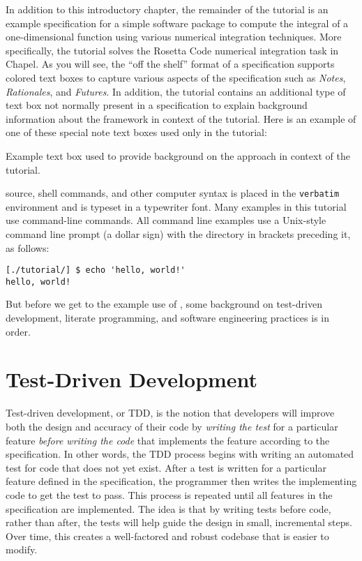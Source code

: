 In addition to this introductory chapter, the remainder of the tutorial is an example \seamless 
specification for a simple software package
to compute the integral of a one-dimensional function using various numerical integration techniques. 
More specifically, the tutorial solves the Rosetta Code numerical integration 
task\cite{rosetta-code-numerical-integration} in Chapel. 
As you will
see, the ``off the shelf'' format of a \seamless specification supports colored text boxes to capture
various aspects of the specification such as \textit{Notes}, \textit{Rationales}, and \textit{Futures}. In addition,
the tutorial contains an additional type of text box not normally present in a specification to explain 
background information about the \seamless framework in context of the tutorial. Here is an example of one
of these special \seamless note text boxes used only in the tutorial:
\begin{seamlessnote}
  Example text box used to provide background on the \seamless approach in context of the tutorial.
\end{seamlessnote}
\latex source, shell commands, and other computer syntax is placed in the \verb|verbatim| environment 
and is typeset in a typewriter font.
Many examples in this tutorial use command-line commands. All command line examples use 
a Unix-style command line prompt (a dollar sign) with the directory in brackets preceding it, as follows:
\begin{verbatim}
[./tutorial/] $ echo 'hello, world!'
hello, world!
\end{verbatim}
But before we get to the example use of \seamless, some background on test-driven development, literate programming,
and software engineering practices is in order.

\section{Test-Driven Development}
Test-driven development, or TDD, is the notion that developers will improve both the design and
accuracy of their code by \textit{writing the test} for a particular feature \textit{before writing the 
code} that implements the feature according to the specification. In other words, the TDD process 
begins with writing an automated test for code that does not yet 
exist. After a test is written for a particular feature defined in the specification, the 
programmer then writes the implementing code to get the test to pass. This process is repeated until
all features in the specification are implemented.  
The idea is that by writing tests before code, rather than after, the tests will help guide
the design in small, incremental steps. Over time, this creates a well-factored and robust
codebase that is easier to modify.


